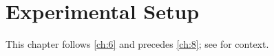 \chapter{Experimental Setup}\label{ch:7}
\lipsum[74-76]

This chapter follows \cref{ch:6} and precedes \cref{ch:8}; see \citep{main-1,main-3} for context.
